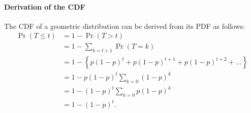 \documentclass{masterthesis}
\begin{document}
\paragraph*{Derivation of the CDF}
The CDF of a geometric distribution can be derived from its PDF as follows:
\begin{align*}
    \Pr(T \leq t) &= 1 - \Pr(T > t) \\
    &= 1 - \sum_{k=t+1} \Pr(T = k) \\
    &= 1 - \left\{p (1 - p)^t + p (1 - p)^{t+1} + p (1 - p)^{t+2} + \ldots\right\} \\
    &= 1 - p (1 - p)^t \sum_{k=0} (1 - p)^k \\
    &= 1 - (1 - p)^t \sum_{k=0} p (1 - p)^k \\
    &= 1 - (1 - p)^t.
\end{align*} %
\end{document}
